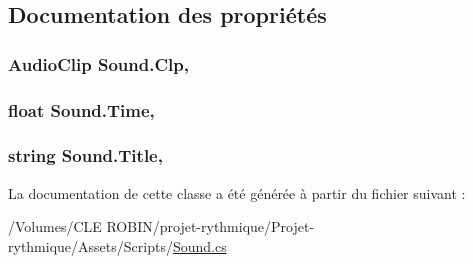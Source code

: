 \subsection{Documentation des propriétés}
\hypertarget{class_sound_a7132714a2858529a7ead633608daef67}{}
\subsubsection[{Clp}]{\setlength{\rightskip}{0pt plus 5cm}Audio\+Clip Sound.\+Clp\hspace{0.3cm}{\ttfamily [get]}, {\ttfamily [set]}}\label{class_sound_a7132714a2858529a7ead633608daef67}
\hypertarget{class_sound_af23b0067b9f8a8431635e45467a26f47}{}
\subsubsection[{Time}]{\setlength{\rightskip}{0pt plus 5cm}float Sound.\+Time\hspace{0.3cm}{\ttfamily [get]}, {\ttfamily [set]}}\label{class_sound_af23b0067b9f8a8431635e45467a26f47}
\hypertarget{class_sound_a2e949808e2fbfbc883a94e8743d5297b}{}
\subsubsection[{Title}]{\setlength{\rightskip}{0pt plus 5cm}string Sound.\+Title\hspace{0.3cm}{\ttfamily [get]}, {\ttfamily [set]}}\label{class_sound_a2e949808e2fbfbc883a94e8743d5297b}


La documentation de cette classe a été générée à partir du fichier suivant \+:\begin{DoxyCompactItemize}
\item 
/\+Volumes/\+C\+L\+E R\+O\+B\+I\+N/projet-\/rythmique/\+Projet-\/rythmique/\+Assets/\+Scripts/\hyperlink{_sound_8cs}{Sound.\+cs}\end{DoxyCompactItemize}
